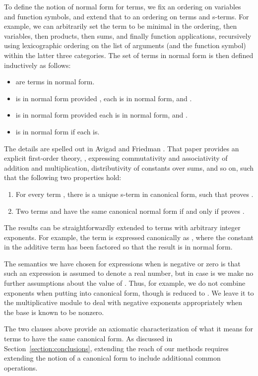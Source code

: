 \documentclass[runningheds]{llncs}
\begin{document}
To define the notion of normal form for terms, we fix an ordering  on variables and function symbols, and extend that to an ordering on terms and s-terms. For example, we can arbitrarily set the term  to be minimal in the ordering, then variables, then products, then sums, and finally function applications, recursively using lexicographic ordering on the list of arguments (and the function symbol) within the latter three categories. The set of terms in normal form is then defined inductively as follows:
\begin{itemize}
 \item  are terms in normal form.
 \item  is in normal form provided , each  is in normal form, and .
 \item  is in normal form provided each  is in normal form, and .
 \item  is in normal form if each  is.
\end{itemize}
The details are spelled out in Avigad and Friedman \cite{avigad:friedman:06}. That paper provides an explicit first-order theory, , expressing commutativity and associativity of addition and multiplication, distributivity of constants over sums, and so on, such that the following two properties hold:
\begin{enumerate}
 \item For every term , there is a unique s-term  in canonical form, such that  proves .
 \item Two terms  and  have the same canonical normal form if and only if  proves .
\end{enumerate}
The results can be straightforwardly extended to terms with arbitrary integer exponents. For example, the term  is expressed canonically as , where the constant in the additive term  has been factored so that the result is in normal form. 

The semantics we have chosen for expressions  when  is negative or zero is that such an expression is assumed to denote a real number, but in case  is  we make no further assumptions about the value of . Thus, for example, we do not combine exponents when putting  into canonical form, though  is reduced to . We leave it to the multiplicative module to deal with negative exponents appropriately when the base is known to be nonzero.

The two clauses above provide an axiomatic characterization of what it means for terms to have the same canonical form. As discussed in Section~\ref{section:conclusions}, extending the reach of our methods requires extending the notion of a canonical form to include additional common operations. 
\end{document}
